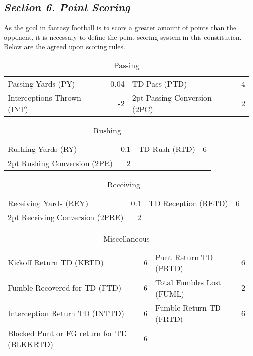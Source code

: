 \documentclass{article}
\begin{document}
    \subsection{\textit{Section 6. Point Scoring}}
    As the goal in fantasy football is to score a greater amount of points than the opponent, it is necessary to define the point scoring system in this constitution. Below are the agreed upon scoring rules.
    \begin{table}[h]
        \caption{Passing}
        \begin{tabular}{lr|lr}
            \hline
            Passing Yards (PY) & 0.04 & TD Pass (PTD) & 4\\
            Interceptions Thrown (INT) & -2 & 2pt Passing Conversion (2PC) & 2\\
            \hline
        \end{tabular}
    \end{table}
    \begin{table}[h]
        \caption{Rushing}
        \begin{tabular}{lr|lr}
            \hline
            Rushing Yards (RY) & 0.1 & TD Rush (RTD) & 6\\
            2pt Rushing Conversion (2PR) & 2\\
            \hline
        \end{tabular}
    \end{table}
    \begin{table}[h]
        \caption{Receiving}
        \begin{tabular}{lr|lr}
            \hline
            Receiving Yards (REY) & 0.1 & TD Reception (RETD) & 6\\
            2pt Receiving Conversion (2PRE) & 2\\
            \hline
        \end{tabular}
    \end{table}
    \begin{table}[h]
        \caption{Miscellaneous}
        \begin{tabular}{lr|lr}
            \hline
            Kickoff Return TD (KRTD) & 6 & Punt Return TD (PRTD) & 6\\
            Fumble Recovered for TD (FTD) & 6 & Total Fumbles Lost (FUML) & -2\\
            Interception Return TD (INTTD) & 6 & Fumble Return TD (FRTD) & 6\\
            Blocked Punt or FG return for TD (BLKKRTD) & 6\\
            \hline
        \end{tabular}
    \end{table}
\end{document}
